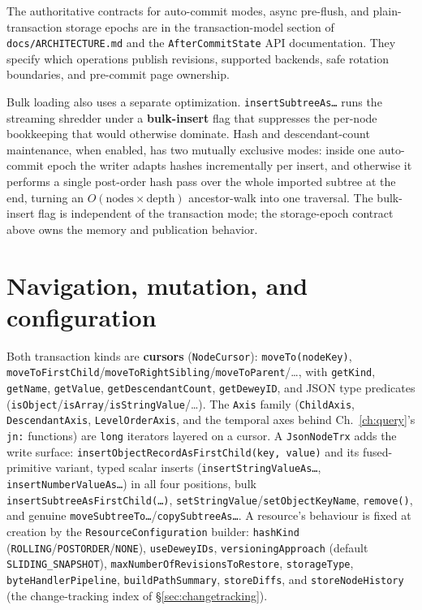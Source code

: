 \documentclass[11pt,a4paper,oneside]{report}
\theoremstyle{sirixthm}
\newcommand{\code}[1]{\texttt{#1}}
\begin{document}
The authoritative contracts for auto-commit modes, async pre-flush, and plain-transaction
storage epochs are in the transaction-model section of \code{docs/ARCHITECTURE.md} and the
\code{AfterCommitState} API documentation. They specify which operations publish revisions,
supported backends, safe rotation boundaries, and pre-commit page ownership.

Bulk loading also uses a separate optimization. \code{insertSubtreeAs\ldots} runs the streaming shredder under a
\textbf{bulk-insert} flag that suppresses the per-node bookkeeping that would otherwise dominate. Hash
and descendant-count maintenance, when enabled, has two mutually exclusive modes: inside one auto-commit
epoch the writer adapts hashes incrementally per insert, and otherwise it performs a single post-order
hash pass over the whole imported subtree at the end, turning an $O(\text{nodes}\times\text{depth})$
ancestor-walk into one traversal. The bulk-insert flag is independent of the transaction mode;
the storage-epoch contract above owns the memory and publication behavior.

\section{Navigation, mutation, and configuration}

Both transaction kinds are \textbf{cursors} (\code{NodeCursor}): \code{moveTo(nodeKey)},
\code{moveToFirstChild}/\allowbreak\code{moveToRightSibling}/\allowbreak\code{moveToParent}/\ldots, with \code{getKind},
\code{getName}, \code{getValue}, \code{getDescendantCount}, \code{getDeweyID}, and JSON type predicates
(\code{isObject}/\allowbreak\code{isArray}/\allowbreak\code{isStringValue}/\ldots). The \code{Axis} family (\code{ChildAxis},
\code{DescendantAxis}, \code{LevelOrderAxis}, and the temporal axes behind Ch.~\ref{ch:query}'s
\code{jn:} functions) are \code{long} iterators layered on a cursor. A \code{JsonNodeTrx} adds the write
surface: \code{insertObjectRecordAsFirstChild(key, value)} and its fused-primitive variant, typed
scalar inserts (\code{insertStringValueAs\ldots}, \code{insertNumberValueAs\ldots}) in all four
positions, bulk \code{insertSubtreeAsFirstChild(\ldots)}, \code{setStringValue}/\allowbreak\code{setObjectKeyName},
\code{remove()}, and genuine \code{moveSubtreeTo\ldots}/\allowbreak\code{copySubtreeAs\ldots}. A resource's
behaviour is fixed at creation by the \code{ResourceConfiguration} builder: \code{hashKind}
(\code{ROLLING}/\allowbreak\code{POSTORDER}/\allowbreak\code{NONE}), \code{useDeweyIDs}, \code{versioningApproach} (default
\code{SLIDING\_SNAPSHOT}), \code{maxNumberOfRevisionsToRestore}, \code{storageType},
\code{byteHandlerPipeline}, \code{buildPathSummary}, \code{storeDiffs}, and \code{storeNodeHistory} (the
change-tracking index of \S\ref{sec:changetracking}).
\end{document}
